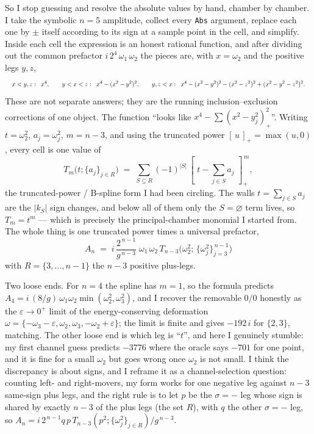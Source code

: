 \documentclass{article}
\newcommand{\pp}[1]{\left[\,#1\,\right]_{+}}
\newcommand{\fitdisplay}[1]{\resizebox{\linewidth}{!}{$\displaystyle #1$}}
\begin{document}
So I stop guessing and resolve the absolute values by hand, chamber by chamber. I
take the symbolic $n=5$ amplitude, collect every \texttt{Abs} argument, replace
each one by $\pm$ itself according to its sign at a sample point in the cell, and
simplify. Inside each cell the expression is an honest rational function, and
after dividing out the common prefactor $i\,2^{4}\,\omega_1\,\omega_2$ the pieces
are, with $x=\omega_2$ and the positive legs $y,z$,
\[
\fitdisplay{
x<y,z:\;\; x^{4},\qquad
y<x<z:\;\; x^4-(x^2-y^2)^2,\qquad
y,z<x:\;\; x^4-(x^2-y^2)^2-(x^2-z^2)^2+(x^2-y^2-z^2)^2 .
}
\]
These are not separate answers; they are the running inclusion--exclusion
corrections of one object. The function ``looks like $x^4-\sum(x^2-y_j^2)_+^2$''.
Writing $t=\omega_2^2$, $a_j=\omega_j^2$, $m=n-3$, and using the truncated power
$\pp{u}=\max(u,0)$, every cell is one value of
\[
T_m\big(t;\{a_j\}_{j\in R}\big)\;=\;\sum_{S\subseteq R}(-1)^{|S|}\,
\pp{\,t-\sum_{j\in S}a_j\,}^{\,m},
\]
the truncated-power / B-spline form I had been circling. The walls
$t=\sum_{j\in S}a_j$ are the $|k_S|$ sign changes, and below all of them only the
$S=\varnothing$ term lives, so $T_m=t^m$ --- which is precisely the principal-chamber
monomial I started from. The whole thing is one truncated power times a universal
prefactor,
\[
\boxed{\;
A_n \;=\; i\,\frac{2^{\,n-1}}{g^{\,n-3}}\;\omega_1\,\omega_2\,
T_{n-3}\!\Big(\omega_2^2;\,\{\omega_j^2\}_{j=3}^{\,n-1}\Big)\;}
\]
with $R=\{3,\dots,n-1\}$ the $n-3$ positive plus-legs.

Two loose ends. For $n=4$ the spline has $m=1$, so the formula predicts
$A_4=i\,(8/g)\,\omega_1\omega_2\min(\omega_2^2,\omega_3^2)$, and I recover the
removable $0/0$ honestly as the $\varepsilon\to0^+$ limit of the
energy-conserving deformation
$\omega=\{-\omega_3-\varepsilon,\omega_2,\omega_3,-\omega_2+\varepsilon\}$; the
limit is finite and gives $-192\,i$ for $\{2,3\}$, matching. The other loose end
is which leg is ``$t$'', and here I genuinely stumble: my first channel guess
predicts $-3776$ where the oracle says $-701$ for one point, and it is fine for a
small $\omega_2$ but goes wrong once $\omega_2$ is not small. I think the
discrepancy is about signs, and I reframe it as a channel-selection question:
counting left- and right-movers, my form works for one negative leg against
$n-3$ same-sign plus legs, and the right rule is to let $p$ be the $\sigma=-$ leg
whose sign is shared by exactly $n-3$ of the plus legs (the set $R$), with $q$ the
other $\sigma=-$ leg, so
$A_n=i\,2^{\,n-1}q\,p\,T_{n-3}(p^2;\{\omega_j^2\}_{j\in R})/g^{\,n-3}$.
\end{document}
